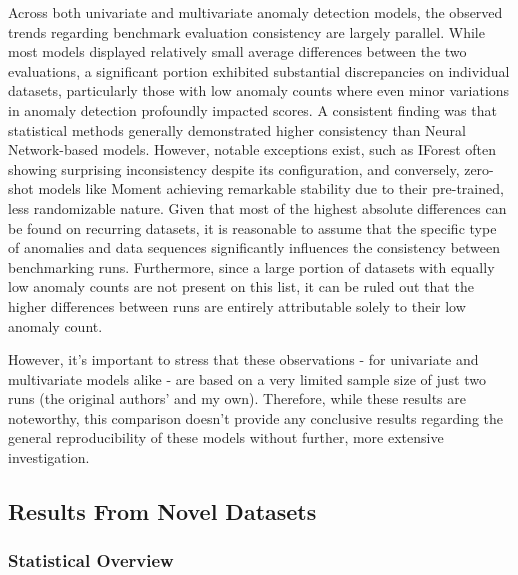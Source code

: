 \documentclass[12pt,oneside]{article}
\begin{document}
Across both univariate and multivariate anomaly detection models, the observed trends regarding benchmark evaluation consistency are largely parallel. While most models displayed relatively small average differences between the two evaluations, a significant portion exhibited substantial discrepancies on individual datasets, particularly those with low anomaly counts where even minor variations in anomaly detection profoundly impacted scores. A consistent finding was that statistical methods generally demonstrated higher consistency than Neural Network-based models. However, notable exceptions exist, such as IForest often showing surprising inconsistency despite its configuration, and conversely, zero-shot models like Moment achieving remarkable stability due to their pre-trained, less randomizable nature. Given that most of the highest absolute differences can be found on recurring datasets, it is reasonable to assume that the specific type of anomalies and data sequences significantly influences the consistency between benchmarking runs. Furthermore, since a large portion of datasets with equally low anomaly counts are not present on this list, it can be ruled out that the higher differences between runs are entirely attributable solely to their low anomaly count. \par
However, it's important to stress that these observations - for univariate and multivariate models alike - are based on a very limited sample size of just two runs (the original authors' and my own). Therefore, while these results are noteworthy, this comparison doesn't provide any conclusive results regarding the general reproducibility of these models without further, more extensive investigation.

\subsection{Results From Novel Datasets}

\subsubsection{Statistical Overview}
\end{document}
